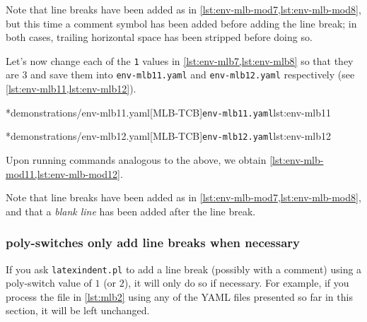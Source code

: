 	Note that line breaks have been added as in \cref{lst:env-mlb-mod7,lst:env-mlb-mod8}, but this time a comment symbol has been added before adding the line break; in both cases, trailing horizontal space has been stripped before doing so.

	Let's%
	 now change each of the \texttt{1} values in \cref{lst:env-mlb7,lst:env-mlb8} so that they are $3$ and save them into \texttt{env-mlb11.yaml} and \texttt{env-mlb12.yaml} respectively (see \cref{lst:env-mlb11,lst:env-mlb12}).

	\begin{minipage}{.49\textwidth}
		\cmhlistingsfromfile[style=yaml-LST]*{demonstrations/env-mlb11.yaml}[MLB-TCB]{\texttt{env-mlb11.yaml}}{lst:env-mlb11}
	\end{minipage}
	\hfill
	\begin{minipage}{.49\textwidth}
		\cmhlistingsfromfile[style=yaml-LST]*{demonstrations/env-mlb12.yaml}[MLB-TCB]{\texttt{env-mlb12.yaml}}{lst:env-mlb12}
	\end{minipage}

	Upon running  commands analogous to the above, we obtain \cref{lst:env-mlb-mod11,lst:env-mlb-mod12}.

	\begin{widepage}
		\begin{minipage}{.42\linewidth}
		\end{minipage}
		\hfill
		\begin{minipage}{.57\linewidth}
		\end{minipage}
	\end{widepage}

	Note that line breaks have been added as in \cref{lst:env-mlb-mod7,lst:env-mlb-mod8}, and that a \emph{blank line} has been added after the line break.

\subsubsection{poly-switches only add line breaks when necessary}
	If you ask \texttt{latexindent.pl} to add a line break (possibly with a comment) using a poly-switch value of $1$ (or $2$), it will only do so if necessary.
	For example, if you process the file in \vref{lst:mlb2} using any of the YAML files presented so far in this section, it will be left unchanged.

